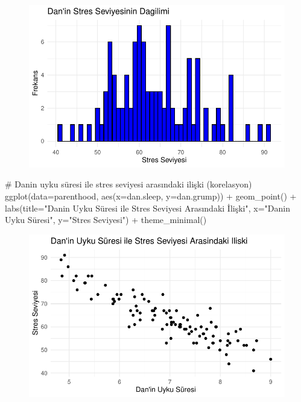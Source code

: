 \documentclass[
  letterpaper,
  DIV=11,
  numbers=noendperiod]{scrartcl}
\newenvironment{Shaded}{\begin{snugshade}}{\end{snugshade}}
\newcommand{\AttributeTok}[1]{\textcolor[rgb]{0.40,0.45,0.13}{#1}}
\newcommand{\CommentTok}[1]{\textcolor[rgb]{0.37,0.37,0.37}{#1}}
\newcommand{\FunctionTok}[1]{\textcolor[rgb]{0.28,0.35,0.67}{#1}}
\newcommand{\NormalTok}[1]{\textcolor[rgb]{0.00,0.23,0.31}{#1}}
\newcommand{\SpecialCharTok}[1]{\textcolor[rgb]{0.37,0.37,0.37}{#1}}
\newcommand{\StringTok}[1]{\textcolor[rgb]{0.13,0.47,0.30}{#1}}
\begin{document}
\begin{figure}[H]

{\centering \includegraphics{4_hafta_tanimlayici_istatistik_files/figure-pdf/unnamed-chunk-23-1.pdf}

}

\end{figure}

\begin{Shaded}
\begin{Highlighting}[]
\CommentTok{\# Dan\textquotesingle{}in uyku süresi ile stres seviyesi arasındaki ilişki (korelasyon)}
\FunctionTok{ggplot}\NormalTok{(}\AttributeTok{data=}\NormalTok{parenthood, }\FunctionTok{aes}\NormalTok{(}\AttributeTok{x=}\NormalTok{dan.sleep, }\AttributeTok{y=}\NormalTok{dan.grump)) }\SpecialCharTok{+}
  \FunctionTok{geom\_point}\NormalTok{() }\SpecialCharTok{+}
  \FunctionTok{labs}\NormalTok{(}\AttributeTok{title=}\StringTok{"Dan\textquotesingle{}in Uyku Süresi ile Stres Seviyesi Arasındaki İlişki"}\NormalTok{, }\AttributeTok{x=}\StringTok{"Dan\textquotesingle{}in Uyku Süresi"}\NormalTok{, }\AttributeTok{y=}\StringTok{"Stres Seviyesi"}\NormalTok{) }\SpecialCharTok{+}
  \FunctionTok{theme\_minimal}\NormalTok{()}
\end{Highlighting}
\end{Shaded}

\begin{figure}[H]

{\centering \includegraphics{4_hafta_tanimlayici_istatistik_files/figure-pdf/unnamed-chunk-24-1.pdf}

}

\end{figure}
\end{document}
